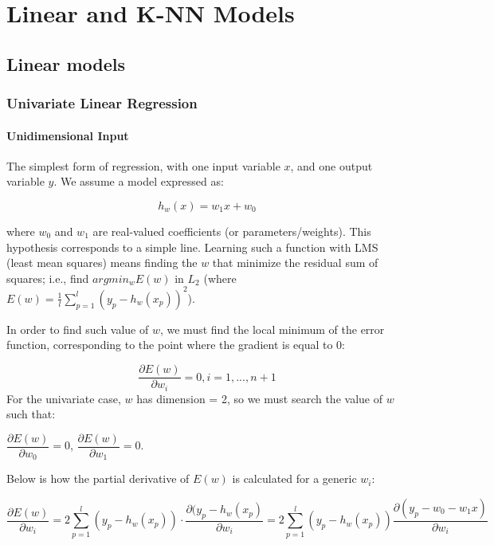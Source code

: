 \chapter{Linear and K-NN Models}

\section{Linear models}

\subsection{Univariate Linear Regression}

\subsubsection{Unidimensional Input}
The simplest form of regression, with one input variable $x$, and one output variable $y$. We assume a model expressed as:

\begin{equation*}
    h_w(x) = w_1 x + w_0
\end{equation*}

where $w_0$ and $w_1$ are real-valued coefficients (or parameters/weights). This hypothesis corresponds to a simple line. Learning such a function with LMS (least mean squares) means finding the $w$ that minimize the residual sum of squares; i.e., find $argmin_w E(w)$ in $L_2$ (where $E(w) = \frac{1}{l}\sum_{p=1}^l (y_p - h_w(x_p))^2$).

In order to find such value of $w$, we must find the local minimum of the error function, corresponding to the point where the gradient is equal to 0:

\begin{equation*}
    \dfrac{\partial E(w)}{\partial w_i} = 0, i = 1, ..., n+1
\end{equation*}
For the univariate case, $w$ has dimension = 2, so we must search the value of $w$ such that:

\begin{center}
    $\dfrac{\partial E(w)}{\partial w_0} = 0$, $\dfrac{\partial E(w)}{\partial w_1} = 0$.
\end{center}
Below is how the partial derivative of $E(w)$ is calculated for a generic $w_i$:

\begin{equation*}
\dfrac{\partial E(w)}{\partial w_i} = 2 \sum_{p=1}^l (y_p - h_w(x_p)) \cdot \dfrac{\partial (y_p - h_w(x_p)}{\partial w_i} = \boxed{2 \sum_{p=1}^l (y_p - h_w(x_p)) \dfrac{\partial (y_p - w_0 - w_1x)}{\partial w_i}}
\end{equation*}

